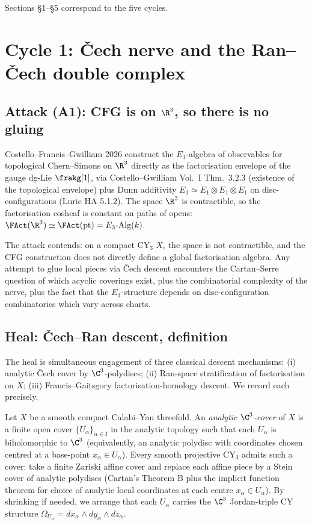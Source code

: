 Sections \S 1--\S 5 correspond to the five cycles.

\section{Cycle 1: Čech nerve and the Ran--Čech double complex}

\subsection*{Attack (A1): CFG is on $\R^3$, so there is no gluing}

Costello--Francis--Gwilliam 2026 construct the $E_3$-algebra of
observables for topological Chern--Simons on $\R^3$ directly as the
factorisation envelope of the gauge dg-Lie $\frakg[1]$, via
Costello--Gwilliam Vol.~I Thm.~3.2.3 (existence of the topological
envelope) plus Dunn additivity $E_3 \simeq E_1 \otimes E_1 \otimes E_1$
on disc-configurations (Lurie HA 5.1.2). The space $\R^3$ is
contractible, so the factorisation cosheaf is constant on paths of
opens: $\FAct(\R^3) \simeq \FAct(\mathrm{pt}) = E_3\text{-Alg}(k)$.

The attack contends: on a compact CY$_3$ $X$, the space is not
contractible, and the CFG construction does not directly define
a global factorisation algebra. Any attempt to glue local pieces via
Čech descent encounters the Cartan--Serre question of which acyclic
coverings exist, plus the combinatorial complexity of the nerve, plus
the fact that the $E_3$-structure depends on disc-configuration
combinatorics which vary across charts.

\subsection*{Heal: Čech--Ran descent, definition}

The heal is simultaneous engagement of three classical descent
mechanisms: (i) analytic Čech cover by $\C^3$-polydiscs; (ii) Ran-space
stratification of factorisation on $X$; (iii) Francis--Gaitsgory
factorisation-homology descent. We record each precisely.

\begin{definition}
\label{def:analytic-c3-cover}
Let $X$ be a smooth compact Calabi--Yau threefold. An \emph{analytic
$\C^3$-cover} of $X$ is a finite open cover $\{U_\alpha\}_{\alpha \in I}$
in the analytic topology such that each $U_\alpha$ is biholomorphic to
$\C^3$ (equivalently, an analytic polydisc with coordinates chosen
centred at a base-point $x_\alpha \in U_\alpha$). Every smooth
projective CY$_3$ admits such a cover: take a finite Zariski affine
cover and replace each affine piece by a Stein cover of analytic
polydiscs (Cartan's Theorem B plus the implicit function theorem for
choice of analytic local coordinates at each centre
$x_\alpha \in U_\alpha$). By shrinking if needed, we arrange that each
$U_\alpha$ carries the $\C^3$ Jordan-triple CY structure
$\Omega_{U_\alpha} = dx_\alpha \wedge dy_\alpha \wedge dz_\alpha$.
\end{definition}

